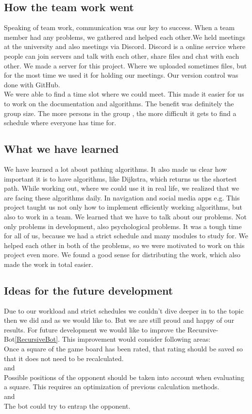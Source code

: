 \documentclass[a4paper,12pt]{article}
\begin{document}
\subsection{How the team work went}
Speaking of team work, communication was our key to success. When a team member had any problems, we gathered and helped each other.We held meetings at the university and also meetings via Discord. Discord is a online service where people can join servers and talk with each other, share files and chat with each other. We made a server for this project. Where we uploaded sometimes files, but for the most time we used it for holding our meetings. Our version control was done with GitHub.\\
We were able to find a time slot where we could meet. This made it easier for us to work on the documentation and algorithms. The benefit was definitely the group size. The more persons in the group , the more difficult it gets to find a schedule where everyone has time for.
\subsection{What we have learned}
We have learned a lot about pathing algorithms. It also made us clear how important it is to have algorithms, like Dijkstra, which returns us the shortest path. While working out, where we could use it in real life, we realized that we are facing these algorithms daily.  In navigation and social media apps e.g.
This project taught us not only how to implement efficiently working algorithms, but also to work in a team. We learned that we have to talk about our problems. Not only problems in development, also psychological problems. It was a tough time for all of us, because we had a strict schedule and many modules to study for. We helped each other in both of the problems, so we were motivated to work on this project even more. We found a good sense for distributing the work, which also made the work in total easier.
\newpage
\subsection{Ideas for the future development}
Due to our workload and strict schedules we couldn't dive deeper in to the topic then we did and as we would like to. But we are still proud and happy of our results. For future development we would like to improve the Recursive-Bot\ref{RecursiveBot}. This improvement would consider following areas:\\
Once a square of the game board has been rated, that rating should be saved so that it does not
need to be recalculated.\\
and\\
Possible positions of the opponent should be taken into account when evaluating a square. This
requires an optimization of previous calculation methods.\\
and\\
The bot could try to entrap the opponent.

\newpage


\end{document}

